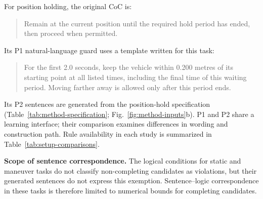 For position holding, the original CoC is:
\begin{quote}\small
Remain at the current position until the required hold period has ended, then
proceed when permitted.
\end{quote}
Its P1 natural-language guard uses a template written for this task:
\begin{quote}\small
For the first 2.0 seconds, keep the vehicle within 0.200 metres of its starting
point at all listed times, including the final time of this waiting period.
Moving farther away is allowed only after this period ends.
\end{quote}
Its P2 sentences are generated from the position-hold specification
(Table~\ref{tab:method-specification}; Fig.~\ref{fig:method-inputs}b).
P1 and P2 share a learning interface; their comparison examines differences
in wording and construction path. Rule availability in each study is
summarized in Table~\ref{tab:setup-comparisons}.

\noindent\textbf{Scope of sentence correspondence.}
The logical conditions for static and maneuver tasks do not classify
non-completing candidates as violations, but their generated sentences do not
express this exemption. Sentence--logic correspondence in these tasks is
therefore limited to numerical bounds for completing candidates.


